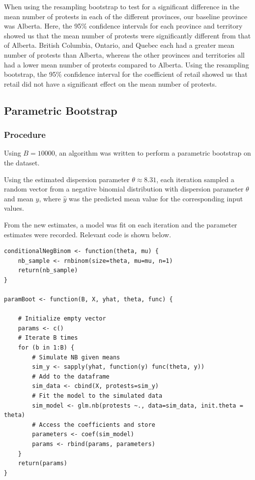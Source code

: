 \documentclass[12pt]{article}
\begin{document}
When using the resampling bootstrap to test for a significant difference in the mean number of protests in each of the different provinces, our baseline province was Alberta. Here, the 95\% confidence intervals for each province and territory showed us that the mean number of protests were significantly different from that of Alberta. British Columbia, Ontario, and Quebec each had a greater mean number of protests than Alberta, whereas the other provinces and territories all had a lower mean number of protests compared to Alberta.
Using the resampling bootstrap, the 95\% confidence interval for the coefficient of retail showed us that retail did not have a significant effect on the mean number of protests.



\newpage
\subsection{Parametric Bootstrap}
\subsubsection*{Procedure}
Using $B = 10000$, an algorithm was written to perform a parametric bootstrap on the dataset.

Using the estimated dispersion parameter $\theta \approx 8.31$, each iteration sampled a random vector from a negative binomial distribution with dispersion parameter $\theta$ and mean $\hat y$, where $\hat y$ was the predicted mean value for the corresponding input values.

From the new estimates, a model was fit on each iteration and the parameter estimates were recorded. Relevant code is shown below.
\vspace{0.5cm}
\begin{lstlisting}
conditionalNegBinom <- function(theta, mu) {
    nb_sample <- rnbinom(size=theta, mu=mu, n=1)
    return(nb_sample)
}

paramBoot <- function(B, X, yhat, theta, func) {

    # Initialize empty vector
    params <- c()
    # Iterate B times
    for (b in 1:B) {
        # Simulate NB given means
        sim_y <- sapply(yhat, function(y) func(theta, y))
        # Add to the dataframe
        sim_data <- cbind(X, protests=sim_y)
        # Fit the model to the simulated data
        sim_model <- glm.nb(protests ~., data=sim_data, init.theta = theta)
        # Access the coefficients and store
        parameters <- coef(sim_model)
        params <- rbind(params, parameters)
    }
    return(params)
}
\end{lstlisting}
\end{document}
